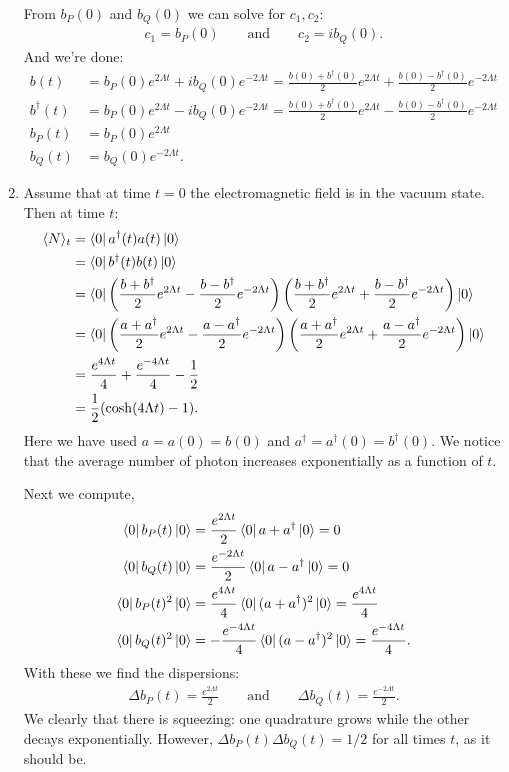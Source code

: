 \documentclass{article}
\theoremstyle{definition}
\newcommand{\f}[2]{\frac{#1}{#2}}
\newcommand{\lp}{\left(}
\newcommand{\rp}{\right)}
\begin{document}
\begin{enumerate}[label=(\alph*)]
From $b_P(0)$ and $b_Q(0)$ we can solve for $c_1, c_2$:
\begin{align*}
c_1 =  b_P(0) \quad\quad \text{and} \quad\quad c_2 = ib_Q(0).
\end{align*}
And we're done:
\begin{align*}
b(t) &= b_P(0) e^{2\Lambda t} + ib_Q(0) e^{-2\Lambda t} 
= \f{b(0) + b^\dagger(0)}{2} e^{2\Lambda t} + \f{b(0) - b^\dagger(0)}{2} e^{-2\Lambda t} \\ 
b^\dagger(t) &= b_P(0) e^{2\Lambda t} - ib_Q(0) e^{-2\Lambda t} 
= \f{b(0) + b^\dagger(0)}{2} e^{2\Lambda t} - \f{b(0) - b^\dagger(0)}{2} e^{-2\Lambda t} \\ 
b_P(t) &= b_P(0)  e^{2\Lambda t}   \\
b_Q(t) &= b_Q(0) e^{-2\Lambda t}.
\end{align*}


\item Assume that at time $t=0$ the electromagnetic field is in the vacuum state. Then at time $t$:
\begin{align*}
\langle N \rangle_t 
&= \bra{0}  a^\dagger(t) a(t) \ket{0} \\
&= \bra{0}  b^\dagger(t) b(t) \ket{0} \\
&= \bra{0} \lp  \f{b +b^\dagger}{2} e^{2\Lambda t} - \f{b -b^\dagger}{2} e^{-2\Lambda t} \rp 
 \lp  \f{b +b^\dagger}{2} e^{2\Lambda t} + \f{b -b^\dagger}{2} e^{-2\Lambda t} \rp \ket{0} \\
 &= \bra{0} \lp  \f{a +a^\dagger}{2} e^{2\Lambda t} - \f{a -a^\dagger}{2} e^{-2\Lambda t} \rp 
 \lp  \f{a +a^\dagger}{2} e^{2\Lambda t} + \f{a -a^\dagger}{2} e^{-2\Lambda t} \rp \ket{0} \\ 
 &= \f{e^{4\Lambda t}}{4} + \f{e^{-4\Lambda t}}{4} - \f{1}{2} \\
 &= \f{1}{2}( \cosh(4\Lambda t) - 1 ).
\end{align*}
Here we have used $a = a(0) = b(0)$ and $a^\dagger = a^\dagger(0) = b^\dagger(0)$.  We notice that the average number of photon increases exponentially as a function of $t$. 


Next we compute,
\begin{align*}
\bra{0}  b_P(t)   \ket{0} 
&= \f{e^{2\Lambda t}}{2} \bra{0} a + a^\dagger  \ket{0} = 0 \\
\bra{0} b_Q(t) \ket{0} 
&= \f{e^{-2\Lambda t}}{2} \bra{0}   a - a^\dagger \ket{0} = 0\\
\bra{0}   b_P(t)^2  \ket{0} 
&=  \f{e^{4\Lambda t}}{4} \bra{0} (a + a^\dagger)^2 \ket{0} = \f{e^{4\Lambda t}}{4} \\ 
\bra{0} b_Q(t)^2 \ket{0}
&= -\f{e^{-4\Lambda t}}{4} \bra{0} (a - a^\dagger)^2 \ket{0} = \f{e^{-4\Lambda t}}{4}.
\end{align*}
With these we find the dispersions:
\begin{align*}
\Delta b_P(t) = \f{e^{2\Lambda t}}{2} \quad\quad \text{and} \quad\quad \Delta b_Q(t) = \f{e^{-2\Lambda t}}{2}.
\end{align*}
We clearly that there is squeezing: one quadrature grows while the other decays exponentially. However, $\Delta b_P(t) \Delta b_Q(t) = 1/2$ for all times $t$, as it should be. 





\end{enumerate}
\end{document}
